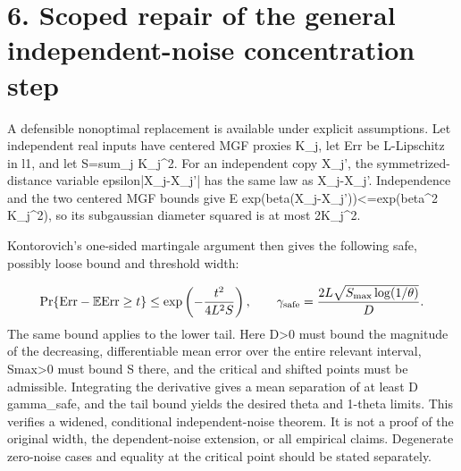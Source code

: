 \documentclass[10pt]{article}
\begin{document}
\section*{6. Scoped repair of the general independent-noise concentration step}
A defensible nonoptimal replacement is available under explicit assumptions. Let independent real inputs have centered MGF proxies K\_j, let Err be L-Lipschitz in l1, and let S=sum\_j K\_j\textasciicircum{}2. For an independent copy X\_j’, the symmetrized-distance variable epsilon|X\_j-X\_j’| has the same law as X\_j-X\_j’. Independence and the two centered MGF bounds give E exp(beta(X\_j-X\_j’))<=exp(beta\textasciicircum{}2 K\_j\textasciicircum{}2), so its subgaussian diameter squared is at most 2K\_j\textasciicircum{}2.\par
Kontorovich’s one-sided martingale argument then gives the following safe, possibly loose bound and threshold width:\par
\[\Pr\{\mathrm{Err}-\mathbb E\mathrm{Err}\ge t\}\le\exp\left(-\frac{t^2}{4L^2S}\right),\qquad\gamma_{\rm safe}=\frac{2L\sqrt{S_{\max}\log(1/\theta)}}{D}.\] The same bound applies to the lower tail. Here D>0 must bound the magnitude of the decreasing, differentiable mean error over the entire relevant interval, Smax>0 must bound S there, and the critical and shifted points must be admissible. Integrating the derivative gives a mean separation of at least D gamma\_safe, and the tail bound yields the desired theta and 1-theta limits. This verifies a widened, conditional independent-noise theorem. It is not a proof of the original width, the dependent-noise extension, or all empirical claims. Degenerate zero-noise cases and equality at the critical point should be stated separately.\par
\end{document}
